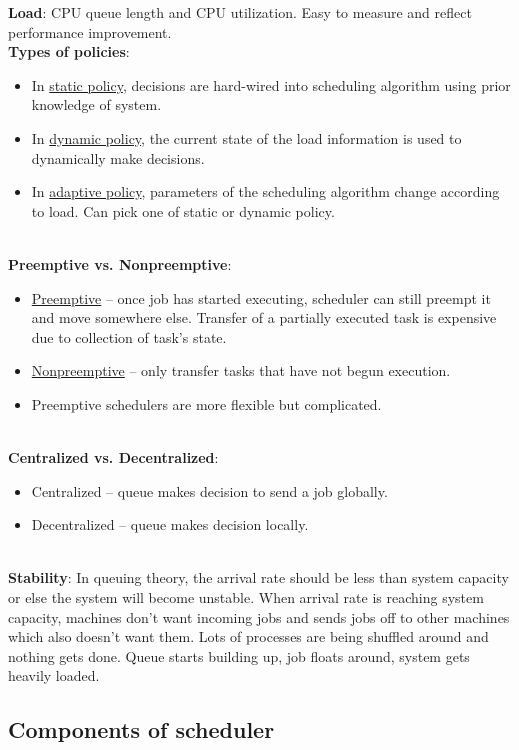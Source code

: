 \documentclass[twoside]{article}
\begin{document}
{\bf Load}: CPU queue length and CPU utilization. Easy to measure and reflect performance improvement. \\

{\bf Types of policies}: 
\begin{itemize}
\item {In \underline{static policy}, decisions are hard-wired into scheduling algorithm using prior knowledge of system.} 
\item {In \underline{dynamic policy}, the current state of the load information is used to dynamically make decisions.}
\item{In \underline{adaptive policy}, parameters of the scheduling algorithm change according to load. Can pick one of static or dynamic policy.}
\end{itemize} \\

{\bf Preemptive vs. Nonpreemptive}: 
\begin{itemize}
\item {\underline{Preemptive}  -- once job has started executing, scheduler can still preempt it and move somewhere else. Transfer of a partially executed task is expensive due to collection of task's state.} 
\item {\underline{Nonpreemptive} -- only transfer tasks that have not begun execution.}
\item {Preemptive schedulers are more flexible but complicated.}
 \end{itemize} \\

{\bf Centralized vs. Decentralized}: 
\begin{itemize}
\item {Centralized -- queue makes decision to send a job globally.}
\item {Decentralized -- queue makes decision locally.}
 \end{itemize} \\

{\bf Stability}: In queuing theory, the arrival rate should be less than system capacity or else the system will become unstable. When arrival rate is reaching system capacity, machines don't want incoming jobs and sends jobs off to other machines which also doesn't want them. Lots of processes are being shuffled around and nothing gets done. Queue starts building up, job floats around, system gets heavily loaded.

\subsection{Components of scheduler}
\end{document}
